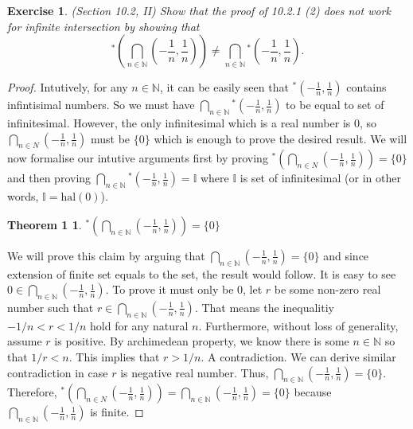 \documentclass[a4paper, 11pt, openany]{book}
\theoremstyle{plain}
\newtheorem{exercise}{Exercise}[chapter]
\newtheorem*{theorem1}{Theorem 1}
\theoremstyle{plain}
\newcommand{\N}{\mathbb{N}}
\newcommand{\I}{\mathbb{I}}
\newcommand{\hyp}{{}^*}
\newcommand{\hal}{\text{hal}}
\begin{document}
    \begin{exercise}
      (Section 10.2, II) 
      Show that the proof of 10.2.1 (2) does not work for infinite intersection by showing that $$\hyp \left( \bigcap_{n \in \N} \left(-\frac{1}{n}, \frac{1}{n}\right) \right) \not = \bigcap_{n \in \N} \hyp \left( - \frac{1}{n}, \frac{1}{n} \right).$$
    \end{exercise}
    \begin{proof}
      Intutively, for any $n \in \N$, it can be easily seen that $\hyp \left(- \frac{1}{n}, \frac{1}{n}\right)$ contains infintisimal numbers. So we must have $\bigcap_{n \in \N} \hyp \left(- \frac{1}{n}, \frac{1}{n}\right)$ to be equal to set of infinitesimal. However, the only infinitesimal which is a real number is $0$, so $\bigcap_{n \in N} \left(-\frac{1}{n}, \frac{1}{n}\right)$ must be $\{0\}$ which is enough to prove the desired result. We will now formalise our intutive arguments first by proving $\hyp \left( \bigcap_{n \in N} \left(-\frac{1}{n}, \frac{1}{n}\right) \right)=\{0\}$ and then proving $\bigcap_{n \in \N} \hyp \left( - \frac{1}{n}, \frac{1}{n} \right)=\mathbb{I}$ where $\I$ is set of infinitesimal (or in other words, $\I=\hal(0)$). \\

      \begin{theorem1}
        $\hyp \left( \bigcap_{n \in \N} \left(-\frac{1}{n}, \frac{1}{n}\right) \right)=\{0\}$ 
      \end{theorem1}
      We will prove this claim by arguing that $\bigcap_{n \in \N} \left(- \frac{1}{n}, \frac{1}{n} \right)=\{0\}$ and since extension of finite set equals to the set, the result would follow. It is easy to see $0 \in \bigcap_{n \in \N} \left(- \frac{1}{n}, \frac{1}{n} \right)$. To prove it must only be $0$, let $r$ be some non-zero real number such that $r \in \bigcap_{n \in \N} \left(- \frac{1}{n}, \frac{1}{n} \right)$. That means the inequalitiy $-1/n<r<1/n$ hold for any natural $n$. Furthermore, without loss of generality, assume $r$ is positive. By archimedean property, we know there is some $n \in \N$ so that $1/r<n$. This implies that $r>1/n$. A contradiction. We can derive similar contradiction in case $r$ is negative real number. Thus, $\bigcap_{n \in \N} \left(- \frac{1}{n}, \frac{1}{n} \right)=\{0\}$. Therefore, $\hyp \left( \bigcap_{n \in N} \left(-\frac{1}{n}, \frac{1}{n}\right) \right)=\bigcap_{n \in \N} \left(- \frac{1}{n}, \frac{1}{n} \right)=\{0\}$ because $\bigcap_{n \in \N} \left(- \frac{1}{n}, \frac{1}{n} \right)$ is finite. 


\end{proof}
\end{document}
